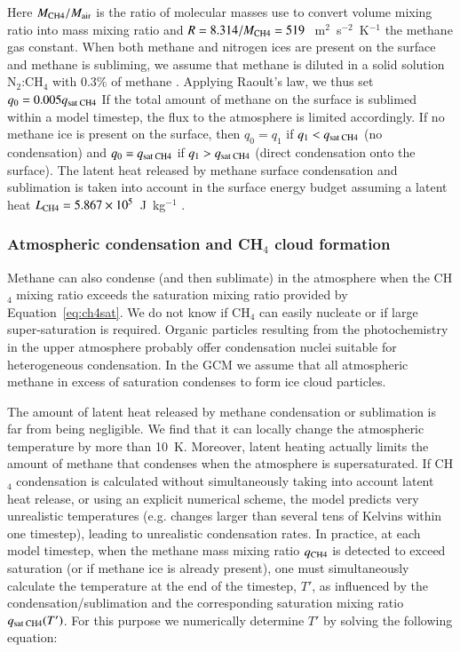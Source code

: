 Here ${M_{\mbox{\scriptsize CH4}}}/{M_{\mbox{\scriptsize air}}}$ is the ratio of molecular masses use
to convert volume mixing ratio into mass mixing ratio and  
$R = 8.314/M_{\mbox{\scriptsize CH4}} = 519~$~m$^2$~s$^{-2}$~K$^{-1}$ the methane gas constant.
When both methane and nitrogen ices are 
present on the surface and methane is subliming, we assume that methane is diluted in a solid solution N$_2$:CH$_4$
with 0.3\% of methane \citep{Merl:15}. Applying Raoult's law, we thus set $q_0= 0.005
q_{\mbox{\scriptsize  sat CH4}}$
If the total amount of methane on the surface is sublimed within a model timestep, the flux to the atmosphere is limited accordingly. 
If no methane ice is present on the surface, then $q_0= q_1$ if $q_1 <
q_{\mbox{\scriptsize sat CH4}}$ (no condensation) and 
$q_0 = q_{\mbox{\scriptsize sat CH4}}$ if $q_1 > q_{\mbox{\scriptsize sat CH4}}$ (direct condensation onto the surface).
The latent heat released by methane surface condensation and sublimation is taken into account 
in the surface energy budget
assuming a latent heat $L_{\mbox{\scriptsize CH4}} = 5.867 \times 10^5$~J~kg$^{-1}$
 \cite[]{Fray:09}.


\subsubsection{Atmospheric condensation and CH$_4$ cloud formation}

Methane can also condense (and then sublimate) 
in the atmosphere when the CH$_4$ mixing ratio exceeds the saturation mixing ratio provided by 
Equation~\ref{eq:ch4sat}. We do not know if CH$_4$ 
can easily nucleate or if large super-saturation 
is required. Organic
particles resulting from the photochemistry in the upper atmosphere probably offer condensation nuclei suitable for heterogeneous condensation.
In the GCM we assume that all atmospheric methane in excess of saturation 
condenses to form ice cloud particles.

The amount of latent heat released by methane condensation or sublimation is 
far from being negligible. We find that it can locally change the
atmospheric temperature by more than 10~K. Moreover, latent heating  actually limits
the amount of methane that condenses when the atmosphere is supersaturated. 
If CH$_4$ condensation is calculated
without simultaneously taking into account latent heat release, 
or using an explicit numerical scheme, the
model predicts very unrealistic temperatures (e.g. changes larger than several tens of
Kelvins within one timestep), leading to unrealistic condensation rates.  
In practice, at each model timestep, when the methane mass mixing ratio
$q_{\mbox{\scriptsize CH4}}$ 
is detected to exceed saturation (or if methane ice is already present), 
one must simultaneously calculate the temperature at the end of the timestep, $T'$,
as  influenced by the condensation/sublimation 
and the corresponding saturation
mixing ratio $q_{\mbox{\scriptsize sat CH4}}(T')$. For this purpose we numerically determine $T'$ by solving the following equation:

